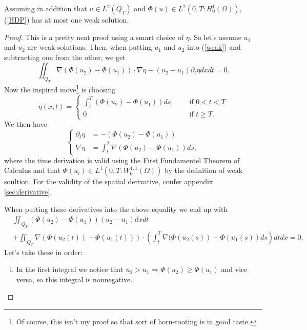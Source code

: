 \documentclass[11pt, a4paper]{article}
\begin{document}
\begin{theorem}[Uniqueness]
\label{thm:uniqueness}
	Assuming in addition that $u \in L^2(Q_T)$ and $\Phi(u) \in L^2(0,T : H_0^1(\Omega))$, (\ref{HDP}) has at most one weak solution.
\end{theorem}

\begin{proof}
This is a pretty neat proof using a smart choice of $\eta$. So let's assume $u_1$ and $u_2$ are weak solutions. Then, when putting $u_1$ and $u_2$ into (\ref{weak}) and subtracting one from the other, we get
\begin{equation}
\label{weak_diff}
\iint_{Q_T}\nabla(\Phi(u_2) - \Phi(u_1)) \cdot \nabla \eta - (u_2 - u_1)\partial_t \eta dxdt = 0.
\end{equation}
Now the inspired move\footnote{Of course, this isn't my proof so that sort of horn-tooting is in good taste.} is choosing
\begin{equation*}
\eta(x,t) = \begin{cases}
		\int_t^T(\Phi(u_2) - \Phi(u_1))ds, \quad &\text{ if } 0 < t < T \\
		0 \quad &\text{ if } t\geq T.
	\end{cases}
\end{equation*}
We then have
\begin{equation*}
\begin{cases}
	\partial_t \eta &= -(\Phi(u_2) - \Phi(u_1) ) \\
	\nabla \eta &= \int_t^T\nabla (\Phi(u_2) - \Phi(u_1))ds,
\end{cases}
\end{equation*}
where the time derivation is valid using the First Fundamentel Theorem of Calculus and that $\Phi(u_i) \in L^1(0,T : W_0^{1,1}(\Omega))$ by the definition of weak soultion. For the validity of the spatial derivative, confer appendix \ref{sec:derivative}.

When putting these derivatives into the above equality we end up with
\begin{equation}
\label{unique}
\begin{aligned}
	&\iint_{Q_T}(\Phi(u_2) - \Phi(u_1))(u_2 - u_1)dxdt \\ 
	&+ \iint_{Q_T}\nabla(\Phi(u_2(t)) - \Phi(u_1(t))) \cdot \left(\int_t^T 					\nabla(\Phi(u_2(s)) - \Phi(u_1(s))ds\right)dtdx = 0.
\end{aligned}
\end{equation}
Let's take these in order:
\begin{enumerate}[i)]
	\item In the first integral we notice that $u_2 > u_1 \Rightarrow \Phi(u_2) \geq \Phi(u_1)$ and vice versa, so this integral is nonnegative.
	

\end{enumerate}
\end{proof}
\end{document}
